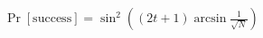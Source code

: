 \documentclass[border=6pt]{standalone}
\begin{document}
\color{ptitnavy}
\(\displaystyle \Pr[\mathrm{success}]=\sin^2\!\left((2t+1)\arcsin\frac{1}{\sqrt{N}}\right)\)
\end{document}

